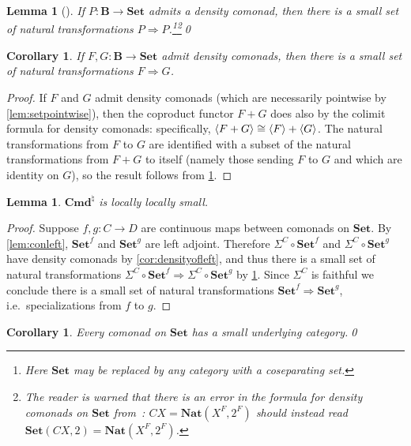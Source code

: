 \documentclass[11pt, oneside, article]{memoir}
\theoremstyle{plain}
\newtheorem{corollary}[theorem]{Corollary}
\newtheorem{lemma}[theorem]{Lemma}
\theoremstyle{definition}
\theoremstyle{remark}
\DeclarePairedDelimiter{\gen}{\langle}{\rangle}
\newcommand{\namedcat}[1]{\mathbf{#1}}
\newcommand{\cat}[1]{\mathbf{#1}}
\newcommand{\Set}{\namedcat{Set}}
\newcommand{\Con}{\namedcat{Cmd}^\natural}
\newcommand{\ConSet}{\Con}
\newcommand{\carr}{\Sigma}
\newcommand{\car}[1]{\carr^{#1}}
\newcommand{\carC}{\car{\cC}}
\newcommand{\ph}[1]{#1}
\newcommand{\con}[2]{{#1}^{#2}}
\newcommand{\cmnd}[1]{{#1}}
\newcommand{\cC}{\cmnd{C}}
\newcommand{\cD}{\cmnd{D}}
\newcommand{\bB}{\cat{B}}
\newcommand{\pP}{\ph{P}}
\begin{document}
\begin{lemma}[{\cite[Corollary 2.3]{adamek-sousa}}]\label{lem:setdensity}
  If $\pP \colon \bB \to \Set$ admits a density comonad, then there is
  a small set of natural transformations
  $\pP \Rightarrow \pP$.\footnote{Here $\Set$ may be replaced by any
    category with a coseparating set.}\footnote{The reader is warned
    that there is an error in the formula for density comonads on
    $\Set$ from~\cite[Corollary 4.3]{adamek-sousa}:
    $CX = \mathbf{Nat}(X^F, 2^F)$ should instead read
    $\Set(CX, 2) = \mathbf{Nat}(X^F, 2^F)$.}\qed
\end{lemma}

\begin{corollary}\label{lem:setofnatural}
  If $F, G \colon \bB \to \Set$ admit density comonads, then there is
  a small set of natural transformations $F \Rightarrow G$.
\end{corollary}
\begin{proof}
  If $F$ and $G$ admit density comonads (which are necessarily
  pointwise by \cref{lem:setpointwise}), then the coproduct functor
  $F + G$ does also by the colimit formula for density comonads:
  specifically, $\gen{F + G} \cong \gen{F} + \gen{G}$. The natural
  transformations from $F$ to $G$ are identified with a subset of the
  natural transformations from $F + G$ to itself (namely those sending
  $F$ to $G$ and which are identity on $G$), so the result follows
  from \cref{lem:setdensity}.
\end{proof}

\begin{lemma}\label{prop:locallysmall}
  $\ConSet$ is locally locally small.
\end{lemma}
\begin{proof}
  Suppose $f, g \colon \cC \to \cD$ are continuous maps between
  comonads on $\Set$. By \cref{lem:conleft}, $\con{\Set}{f}$ and $\con{\Set}{g}$
  are left adjoint. Therefore $\carC \circ \con{\Set}{f}$ and
  $\carC \circ \con{\Set}{g}$ have density comonads by
  \cref{cor:densityofleft}, and thus there is a small set of natural
  transformations
  $\carC \circ \con{\Set}{f} \Rightarrow \carC \circ \con{\Set}{g}$ by
  \cref{lem:setofnatural}. Since $\carC$ is faithful we conclude there
  is a small set of natural transformations
  $\con{\Set}{f} \Rightarrow \con{\Set}{g}$, i.e.\ specializations from $f$ to
  $g$.
\end{proof}

\begin{corollary}\label{cor:smallcategory}
  Every comonad on $\Set$ has a small underlying category.\qed
\end{corollary}
\end{document}
